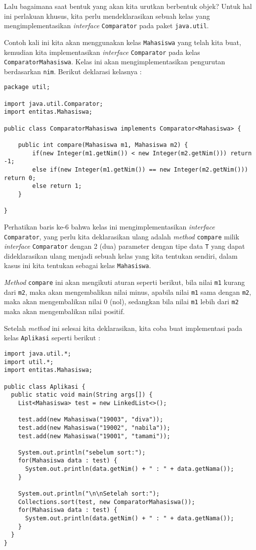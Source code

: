 Lalu bagaimana saat bentuk yang akan kita urutkan berbentuk objek? Untuk hal ini perlakuan khusus, kita perlu mendeklarasikan sebuah kelas yang mengimplementasikan \textit{interface} \texttt{Comparator} pada paket \texttt{java.util}.

Contoh kali ini kita akan menggunakan kelas \texttt{Mahasiswa} yang telah kita buat, kemudian kita implementasikan \textit{interface} \texttt{Comparator} pada kelas \texttt{ComparatorMahasiswa}. Kelas ini akan mengimplementasikan pengurutan berdasarkan \texttt{nim}. Berikut deklarasi kelasnya :

\begin{lstlisting}
package util;

import java.util.Comparator;
import entitas.Mahasiswa;

public class ComparatorMahasiswa implements Comparator<Mahasiswa> {

    public int compare(Mahasiswa m1, Mahasiswa m2) {
        if(new Integer(m1.getNim()) < new Integer(m2.getNim())) return -1;
        else if(new Integer(m1.getNim()) == new Integer(m2.getNim())) return 0;
        else return 1;
    }
    
}
\end{lstlisting}

Perhatikan baris ke-6 bahwa kelas ini mengimplementasikan \textit{interface} \texttt{Comparator}, yang perlu kita deklarasikan ulang adalah \textit{method} \texttt{compare} milik \textit{interface} \texttt{Comparator} dengan 2 (dua) parameter dengan tipe data \texttt{T} yang dapat dideklarasikan ulang menjadi sebuah kelas yang kita tentukan sendiri, dalam kasus ini kita tentukan sebagai kelas \texttt{Mahasiswa}.

\textit{Method} \texttt{compare} ini akan mengikuti aturan seperti berikut, bila nilai \texttt{m1} kurang dari \texttt{m2}, maka akan mengembalikan nilai minus, apabila nilai \texttt{m1} sama dengan \texttt{m2}, maka akan mengembalikan nilai 0 (nol), sedangkan bila nilai \texttt{m1} lebih dari \texttt{m2} maka akan mengembalikan nilai positif.

Setelah \textit{method} ini selesai kita deklarasikan, kita coba buat implementasi pada kelas \texttt{Aplikasi} seperti berikut :

\begin{lstlisting}
import java.util.*;
import util.*;
import entitas.Mahasiswa;

public class Aplikasi {
  public static void main(String args[]) {
    List<Mahasiswa> test = new LinkedList<>();

    test.add(new Mahasiswa("19003", "diva"));
    test.add(new Mahasiswa("19002", "nabila"));
    test.add(new Mahasiswa("19001", "tamami"));

    System.out.println("sebelum sort:");
    for(Mahasiswa data : test) {
      System.out.println(data.getNim() + " : " + data.getNama());
    }

    System.out.println("\n\nSetelah sort:");
    Collections.sort(test, new ComparatorMahasiswa());
    for(Mahasiswa data : test) {
      System.out.println(data.getNim() + " : " + data.getNama());
    }
  }
}
\end{lstlisting}

